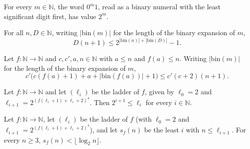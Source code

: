 \begin{theorem}
\label{Turing.NTimeDiag.qy_rung_val}
\leanok
{}
For every $m \in \mathbb{N}$, the word $0^m 1$, read as a binary numeral with the least
significant digit first, has value $2^m$.
\end{theorem}

\begin{theorem}
\label{Turing.NTimeDiag.qy_ones_ge}
\leanok
{}
For all $n, D \in \mathbb{N}$, writing $|\mathrm{bin}(m)|$ for the length of the binary expansion
of $m$,
\[ D(n + 1) \le 2^{|\mathrm{bin}(n)| + |\mathrm{bin}(D)|} - 1. \]
\end{theorem}

\begin{theorem}
\label{Turing.NTimeDiag.qy_call_bound}
\leanok
{}
Let $f : \mathbb{N} \to \mathbb{N}$ and $c, c', a, n \in \mathbb{N}$ with $a \le n$ and
$f(a) \le n$. Writing $|\mathrm{bin}(m)|$ for the length of the binary expansion of $m$,
\[ c'\bigl(c(f(a) + 1) + a + |\mathrm{bin}(f(a))| + 1\bigr) \le c'(c + 2)(n + 1). \]
\end{theorem}

\begin{theorem}
\label{Turing.NTimeDiag.qy_two_pow_le_ladder}
\leanok
{}
Let $f : \mathbb{N} \to \mathbb{N}$ and let $(\ell_i)$ be the ladder of $f$, given by
$\ell_0 = 2$ and $\ell_{i+1} = 2^{(f(\ell_i+1) + \ell_i + 2)^4}$. Then $2^{i+1} \le \ell_i$ for
every $i \in \mathbb{N}$.
\end{theorem}

\begin{theorem}
\label{Turing.NTimeDiag.qy_stage_lt_log}
\leanok
{}
Let $f : \mathbb{N} \to \mathbb{N}$, let $(\ell_i)$ be the ladder of $f$ (with $\ell_0 = 2$ and
$\ell_{i+1} = 2^{(f(\ell_i+1) + \ell_i + 2)^4}$), and let $s_f(n)$ be the least $i$ with
$n \le \ell_{i+1}$. For every $n \ge 3$, $s_f(n) < \lfloor \log_2 n \rfloor$.
\end{theorem}


